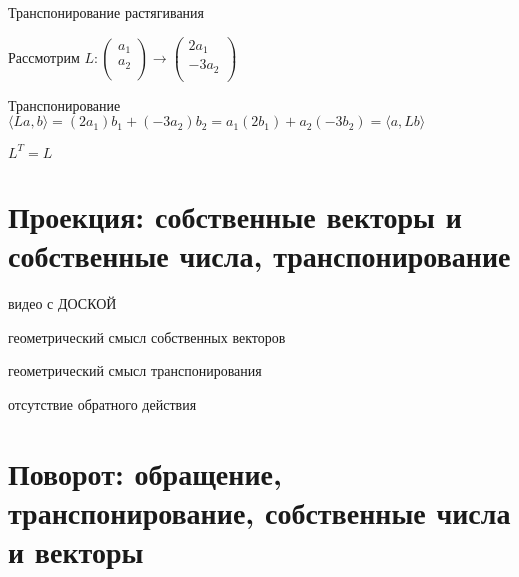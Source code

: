 \documentclass[14pt,xcolor=dvipsnames]{beamer}
\begin{document}
\begin{frame}{Транспонирование растягивания}

Рассмотрим $L : \begin{pmatrix}
  a_1 \\
  a_2 \\
\end{pmatrix} \to
\begin{pmatrix}
  2a_1 \\
  -3a_2 \\
\end{pmatrix}
$
  
\begin{block}{Транспонирование}
$\langle La, b\rangle = (2a_1) b_1 + (-3a_2)b_2 = a_1 (2b_1) + a_2(-3b_2) = \langle a, Lb\rangle$
\end{block}

\begin{block}{$L^T = L$}  
\end{block}

\end{frame}





\section{Проекция: собственные векторы и собственные числа, транспонирование}
  
\begin{frame}{видео с ДОСКОЙ}

\begin{block}{геометрический смысл собственных векторов}
\end{block}

\begin{block}{геометрический смысл транспонирования}
\end{block}

\begin{block}{отсутствие обратного действия}
\end{block}



\end{frame}

\section{Поворот: обращение, транспонирование, собственные числа и векторы}
  
\end{document}
